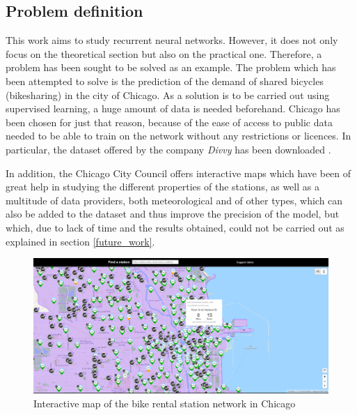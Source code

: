 \subsection{Problem definition}

This work aims to study recurrent neural networks. However, it does not only focus on the theoretical section but also on the practical one. Therefore, a problem has been sought to be solved as an example. The problem which has been attempted to solve is the prediction of the demand of shared bicycles (bikesharing) in the city of Chicago. As a solution is to be carried out using supervised learning, a huge amount of data is needed beforehand. Chicago has been chosen for just that reason, because of the ease of access to public data needed to be able to train on the network without any restrictions or licences. In particular, the dataset offered by the company \textit{Divvy} has been downloaded \cite{divvy}.
\newline
 
In addition, the Chicago City Council offers interactive maps \cite{chicagomap} which have been of great help in studying the different properties of the stations, as well as a multitude of data providers, both meteorological \cite{chicagoweather} and of other types, which can also be added to the dataset and thus improve the precision of the model, but which, due to lack of time and the results obtained, could not be carried out as explained in section \ref{future_work}.
 

\begin{figure}[H]
    \centering
    \includegraphics[width=14cm]{images/solution/preprocessing/divvy-map.png}
    \caption{Interactive map of the bike rental station network in Chicago \cite{chicagomap}}
\end{figure}
